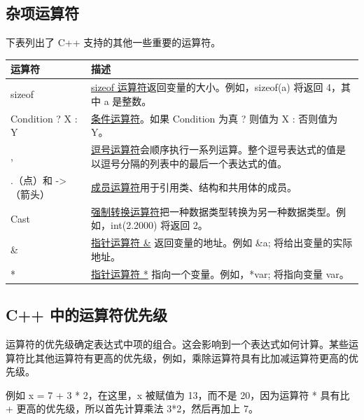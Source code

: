 \documentclass[
]{article}
\begin{document}
\hypertarget{ux6742ux9879ux8fd0ux7b97ux7b26}{%
\subsection{杂项运算符}\label{ux6742ux9879ux8fd0ux7b97ux7b26}}

下表列出了 C++ 支持的其他一些重要的运算符。

\begin{longtable}[]{@{}ll@{}}
\toprule
运算符 & 描述 \\
\midrule
\endhead
sizeof &
\href{https://edu.aliyun.com/cplusplus/cpp-sizeof-operator.html}{sizeof
运算符}返回变量的大小。例如，sizeof(a) 将返回 4，其中 a 是整数。 \\
Condition ? X : Y &
\href{https://edu.aliyun.com/cplusplus/cpp-conditional-operator.html}{条件运算符}。如果
Condition 为真 ? 则值为 X : 否则值为 Y。 \\
, &
\href{https://edu.aliyun.com/cplusplus/cpp-comma-operator.html}{逗号运算符}会顺序执行一系列运算。整个逗号表达式的值是以逗号分隔的列表中的最后一个表达式的值。 \\
.（点）和 -\textgreater（箭头） &
\href{https://edu.aliyun.com/cplusplus/cpp-member-operators.html}{成员运算符}用于引用类、结构和共用体的成员。 \\
Cast &
\href{https://edu.aliyun.com/cplusplus/cpp-casting-operators.html}{强制转换运算符}把一种数据类型转换为另一种数据类型。例如，int(2.2000)
将返回 2。 \\
\& &
\href{https://edu.aliyun.com/cplusplus/cpp-pointer-operators.html}{指针运算符
\&} 返回变量的地址。例如 \&a; 将给出变量的实际地址。 \\
* &
\href{https://edu.aliyun.com/cplusplus/cpp-pointer-operators.html}{指针运算符
*} 指向一个变量。例如，*var; 将指向变量 var。 \\
\bottomrule
\end{longtable}

\hypertarget{c-ux4e2dux7684ux8fd0ux7b97ux7b26ux4f18ux5148ux7ea7}{%
\subsection{C++
中的运算符优先级}\label{c-ux4e2dux7684ux8fd0ux7b97ux7b26ux4f18ux5148ux7ea7}}

运算符的优先级确定表达式中项的组合。这会影响到一个表达式如何计算。某些运算符比其他运算符有更高的优先级，例如，乘除运算符具有比加减运算符更高的优先级。

例如 x = 7 + 3 * 2，在这里，x 被赋值为 13，而不是 20，因为运算符 *
具有比 + 更高的优先级，所以首先计算乘法 3*2，然后再加上 7。
\end{document}
